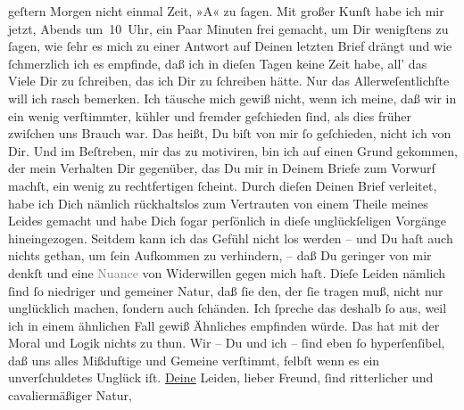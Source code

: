 \begin{ledgroupsized}[t]{13cm}
                  geſtern{ }Morgen nicht einmal Zeit, »A« zu ſagen. Mit großer Kunſt habe ich mir
               jetzt, Abends um 10 Uhr, ein\strikeout{\textcolor{gray}{e Pa}} Paar Minuten frei gemacht, um Dir wenigſtens zu ſagen, wie ſehr es mich zu
               einer Antwort auf Deinen letzten Brief drängt und wie ſchmerzlich ich es empfinde,
               daß ich in dieſen Tagen keine Zeit habe, all’ das Viele {\pb}Dir zu ſchreiben, das ich Dir zu ſchreiben
               hätte.\pend
           \pstart
           Nur das Allerweſentlichſte will ich rasch bemerken. Ich täusche mich gewiß nicht,
               wenn ich meine, daß wir in \label{K_L02651-1v}\label{K_L02651-1h} ein wenig verſtimmter, kühler und fremder geſchieden ſind,
               als dies früher zwiſchen uns Brauch war. Das heißt, Du biſt von mir ſo geſchieden,
               nicht ich von Dir. Und im Beſtreben, mir das zu motiviren, bin ich auf einen Grund
               gekommen, der mein Verhalten Dir gegenüber, das Du mir in Deinem Briefe zum Vorwurf
               machſt, ein wenig zu rechtfertigen ſcheint. Durch dieſen Deinen Brief verleitet, habe
               ich Dich nämlich rückhaltslos zum Vertrauten von einem Theile meines Leides gemacht
               und habe Dich ſogar perſönlich in dieſe unglückſeligen Vorgänge hineingezogen.
               Seitdem kann ich das Gefühl {\pb}nicht los werden – und
               Du haſt auch nichts gethan, um ſein Aufkommen zu verhindern, – daß Du geringer von
               mir denkſt und eine \textcolor{gray}{Nuance} von Widerwillen gegen mich haſt. Dieſe
               Leiden nämlich ſind ſo niedriger und gemeiner Natur, daß ſie den, der ſie tragen muß,
               nicht nur unglücklich machen, ſondern auch ſchänden. Ich ſpreche das deshalb ſo aus,
               weil ich in einem ähnlichen Fall gewiß Ähnliches empfinden würde. Das hat mit der
               Moral und  Logik nichts zu thun. Wir – Du und ich – ſind eben ſo hyperſenſibel, daß uns
               alles Mißduftige und Gemeine verſtimmt, \strikeout{\textcolor{gray}{ſelbst}} felbſt wenn es ein unverſchuldetes Unglück iſt. \uline{Deine} Leiden, lieber Freund, ſind ritterlicher und cavaliermäßiger Natur,

\end{ledgroupsized}
